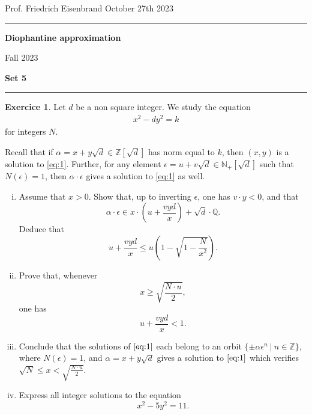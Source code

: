 \documentclass[12pt,a4paper]{article}
\date{}
\theoremstyle{plain}
\newtheorem*{Sol*}{Solution}
\theoremstyle{definition}
\newtheorem{Ex}{Exercice}
\def \N {\mathbb N}
\def \Q {\mathbb Q}
\def \Z {\mathbb Z}
\newif\ifsolutions
\newcommand{\exercise}[2]{
			\begin{Ex} #1 \end{Ex}
			\ifsolutions  \begin{Sol*} #2 \end{Sol*} \bigskip \else \bigskip  \fi
		}
\begin{document}
\begin{center}
{Prof. Friedrich Eisenbrand \hfill October 27th 2023}
\end{center}
	
\hrule\vspace{\baselineskip}

\begin{center}
\textbf{Diophantine approximation}

Fall 2023

\bigskip

\textbf{Set 5}
\ifsolutions{\textbf{- Solutions}} \else{} \fi
\end{center}

\hrule\vspace{\baselineskip}




\exercise{
	Let $d$ be a non square integer.
	We study the equation 
	\begin{align}\label{eq:1} x^2 - dy^2 = k \end{align}
	for integers $N$.

	Recall that if $\alpha = x + y\sqrt{d} \in \Z[\sqrt{d}]$ has norm equal to $k$, then $(x,y)$ is a solution to \eqref{eq:1}.
	Further, for any element $\epsilon = u + v \sqrt{d} \in \N_+[\sqrt{d}]$ such that $N(\epsilon)=1$, then $\alpha \cdot \epsilon$ gives a solution to \eqref{eq:1} as well.

	\begin{enumerate}[i)]
		\item Assume that $x > 0$. Show that, up to inverting $\epsilon$, one has $v \cdot y < 0$, and that
			\[ \alpha \cdot \epsilon \in x \cdot \left(u+ \frac{vyd}{x} \right) + \sqrt{d} \cdot \Q. \]
		Deduce that
			\[ u+ \frac{vyd}{x} \leq u \left( 1 - \sqrt{1-\frac{N}{x^2}} \right).\]

		\item Prove that, whenever
			\[ x \geq \sqrt{\frac{N \cdot u}{2}}, \]
		one has
			\[ u+ \frac{vyd}{x} < 1. \]

		\item Conclude that the solutions of $\eqref{eq:1}$ each belong to an orbit $\{ \pm \alpha \epsilon^n \ | \ n \in \Z \}$, where $N(\epsilon)=1$, and $\alpha = x + y\sqrt{d}$ gives a solution to $\eqref{eq:1}$ which verifies $\sqrt{N} \leq x < \sqrt{\frac{N \cdot u}{2}}$.
		
		\item Express all integer solutions to the equation
			\[ x^2 - 5y^2 = 11. \]
	\end{enumerate}

}
{}
  
\end{document}
